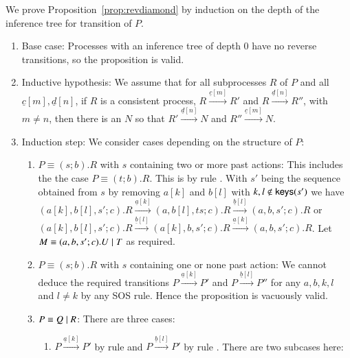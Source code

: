 \begin{pf}
We prove Proposition~\ref{prop:revdiamond} by induction on the depth of the inference tree for transition of $P$.
\begin{enumerate}
\item Base case: Processes with an inference tree of depth 0 have no reverse transitions,
	so the proposition is valid.
\item Inductive hypothesis: We assume that for all subprocesses $R$ of $P$ and all $\underline{c}[m], 
\underline{d}[n]$, if $R$ is a consistent process, $R \xrightarrow{\underline{c}[m]} R'$ and 
$R \xrightarrow{\underline{d}[n]} R''$, with $m \neq n$, then there is an $N$ so that 
$R' \xrightarrow{\underline{d}[n]} N$ and $R'' \xrightarrow{\underline{c}[m]} N$.
\item Induction step: We consider cases depending on the structure of $P$:
\begin{enumerate}
\item $P\equiv (s;b).R$ with $s$ containing two or more past actions: This includes the the case 
$P\equiv (t;b).R$. This is by rule . With $s'$ being the sequence obtained from $s$ 
by removing $a[k]$ and $b[l]$ with $k,l \notin \mathsf{keys}(s')$ we have
$(a[k],b[l],s';c).R \xrightarrow{\underline{a}[k]} (a,b[l],ts;c).R \xrightarrow{\underline{b}[l]} 
(a,b,s';c).R$ or $(a[k],b[l],s';c).R \xrightarrow{\underline{b}[l]} (a[k],b,s';c).R 
\xrightarrow{\underline{a}[k]} (a,b,s';c).R$. Let $M \equiv (a,b,s';c).U \; \vert \; T$ as required.
\item $P\equiv (s;b).R$ with $s$ containing one or none past action: We cannot deduce 
the required transitions $P \xrightarrow{\underline{a}[k]} P'$ and $P \xrightarrow{\underline{b}[l]} P''$  for any $a,b,k,l$ and $l \neq k $ by any SOS rule. Hence the proposition is vacuously valid.
\item $P\equiv Q \; \vert \; R$:
There are three cases:
\begin{enumerate}
\item $P \xrightarrow{\underline{a}[k]} P'$ by rule  and $P \xrightarrow{\underline{b}[l]} P'$ by rule . There are two subcases here:
\begin{enumerate}


\end{enumerate}
\end{enumerate}
\end{enumerate}
\end{enumerate}
\end{pf}
